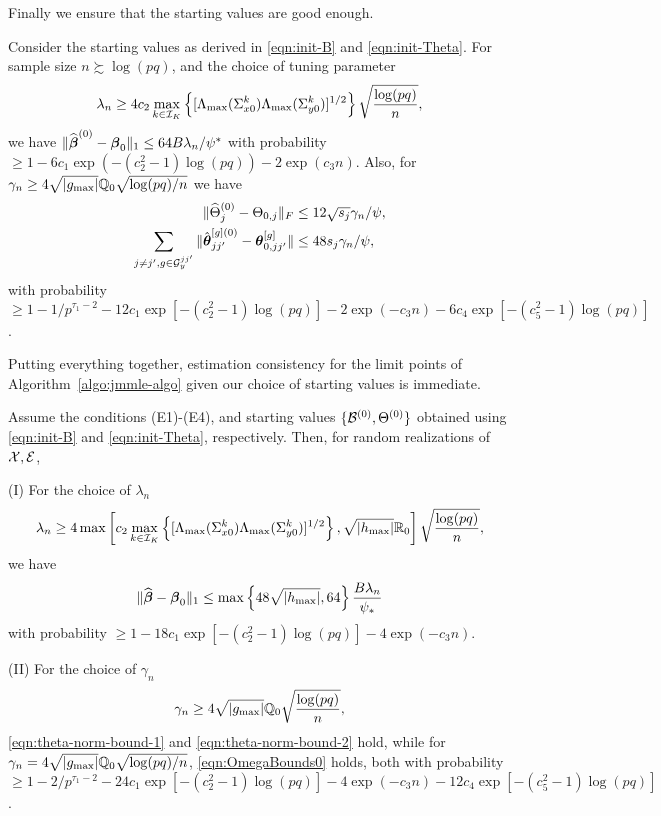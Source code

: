Finally we ensure that the starting values are good enough.

\begin{Theorem}\label{thm:starting-values}
Consider the starting values as derived in \eqref{eqn:init-B} and \eqref{eqn:init-Theta}. For sample size $n \succsim \log(pq)$, and the choice of tuning parameter
%
\[
\lambda_n \geq 4 c_2 \max_{k \in {\cal{I}}_K} \left\{ [\Lambda_{\max} (\Sigma_{x 0}^k) \Lambda_{\max} (\Sigma_{y 0}^k)]^{1/2} \right\}
\sqrt{ \frac{\log (pq)}{n}},
\]
%
we have $\| \widehat {{\boldsymbol{\beta}}}^{(0)} - {\boldsymbol{\beta}}_0 \|_1 \leq 64 B \lambda_n /\psi^*$ with probability $\geq 1 - 6c_1 \exp( -(c_2^2-1) \log(pq)) - 2 \exp(c_3 n)$. Also, for $\gamma_n \geq 4\sqrt{| g_{\max}|} {\mathbb{Q}}_0 \sqrt{ \log (pq)/n}$ we have
%
\begin{align*}
\| \widehat \Theta_j^{(0)} - \Theta_{0,j} \|_F & \leq 12 \sqrt{s_j} \gamma_n / \psi,\\
\sum_{j \neq j', g \in {\cal{G}}_y^{jj'}} \| \hat {{\boldsymbol{\theta}}}_{jj'}^{[g](0)} - {\boldsymbol{\theta}}_{0,jj'}^{[g]} \| & \leq 48 s_j \gamma_n / \psi,
\end{align*}
%
with probability $\geq 1 - 1/p^{\tau_1-2} - 12 c_1 \exp [-(c_2^2-1) \log(pq)] - 2 \exp (- c_3 n) - 6c_4 \exp [-(c_5^2-1) \log(pq)]$.
\end{Theorem}
%

Putting everything together, estimation consistency for the limit points of Algorithm~\ref{algo:jmmle-algo} given our choice of starting values is immediate.

\begin{Corollary}\label{corollary:jmmle-final}
Assume the conditions (E1)-(E4), and starting values $\{ {\cal{B}}^{(0)}, \Theta^{(0)} \}$ obtained using \eqref{eqn:init-B} and \eqref{eqn:init-Theta}, respectively. Then, for random realizations of ${\cal{X}}, {\cal{E}}$,
%

\vspace{1em}
\noindent (I) For the choice of $\lambda_n$
%
$$
\lambda_n \geq 4 \max \left[ c_2 \max_{k \in {\cal{I}}_K} \left\{ [\Lambda_{\max} (\Sigma_{x 0}^k) \Lambda_{\max} (\Sigma_{y 0}^k)]^{1/2} \right\}, \sqrt{| h_{\max}|} {\mathbb{R}}_0 \right] \sqrt{\frac{\log(pq)}{n}},
$$
%
we have
%
$$
\| \widehat {{\boldsymbol{\beta}}} - {\boldsymbol{\beta}}_0 \|_1 \leq \max \left\{ 48 \sqrt{ | h_{\max} |}, 64 \right\} \frac{B \lambda_n}{\psi_*}
$$
%
with probability $\geq 1 - 18 c_1 \exp[-(c_2^2-1) \log(pq)] - 4 \exp( -c_3 n)$.

\vspace{1em}
\noindent (II) For the choice of $\gamma_n$
%
$$
\gamma_n \geq 4 \sqrt{ | g_{\max} |} {\mathbb{Q}}_0 \sqrt{\frac{\log(pq)}{n}},
$$
%
\eqref{eqn:theta-norm-bound-1} and \eqref{eqn:theta-norm-bound-2} hold, while for $\gamma_n = 4 \sqrt{ | g_{\max} |} {\mathbb{Q}}_0 \sqrt{ \log (pq)/n}$, \eqref{eqn:OmegaBounds0} holds, both with probability $\geq 1 - 2/p^{\tau_1-2} - 24 c_1 \exp [-(c_2^2-1) \log(pq)] - 4 \exp (- c_3 n) - 12 c_4 \exp [-(c_5^2-1) \log(pq)]$.
\end{Corollary}